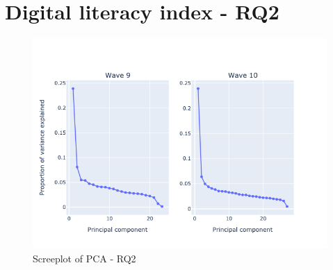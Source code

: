 \section{Digital literacy index - RQ2}


\begin{figure}
    \centering
    \caption{Screeplot of PCA - RQ2}
    \label{fig:screeplot_rq2}
    \includegraphics[width=\textwidth]{figures/pca_screeplot_q2.png}
\end{figure}

